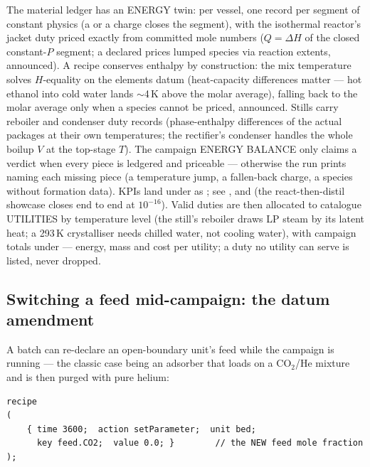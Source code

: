 \documentclass[11pt,a4paper]{article}
\begin{document}
The material ledger has an ENERGY twin: per vessel, one record per
segment of constant physics (a  or a charge closes
the segment), with the isothermal reactor's jacket duty priced exactly
from committed mole numbers ($Q = \Delta H$ of the closed constant-$P$
segment; a declared  prices lumped species via reaction
extents, announced).  A recipe  conserves enthalpy by
construction: the mix temperature solves $H$-equality on the elements
datum (heat-capacity differences matter --- hot ethanol into cold water
lands $\sim$4\,K above the molar average), falling back to the molar
average only when a species cannot be priced, announced.  Stills carry
reboiler and condenser duty records (phase-enthalpy differences of the
actual packages at their own temperatures; the rectifier's condenser
handles the whole boilup $V$ at the top-stage $T$).  The campaign
ENERGY BALANCE only claims a verdict when every piece is ledgered and
priceable --- otherwise the run prints 
naming each missing piece (a temperature jump, a fallen-back charge, a
species without formation data).  KPIs land under  as
; see ,
 and
 (the react-then-distil showcase
closes end to end at $10^{-16}$).  Valid duties are then allocated to
catalogue UTILITIES by temperature level (the still's reboiler draws LP
steam by its latent heat; a 293\,K crystalliser needs chilled water,
not cooling water), with campaign totals under  ---
energy, mass and cost per utility; a duty no utility can serve is
listed, never dropped.

\subsection{Switching a feed mid-campaign: the datum amendment}\label{sec:feed-switch}

A batch  can re-declare an open-boundary unit's feed while
the campaign is running --- the classic case being an adsorber that loads
on a CO$_2$/He mixture and is then purged with pure helium:

\begin{lstlisting}[language=dict]
recipe
(
    { time 3600;  action setParameter;  unit bed;
      key feed.CO2;  value 0.0; }        // the NEW feed mole fraction
);
\end{lstlisting}
\end{document}
